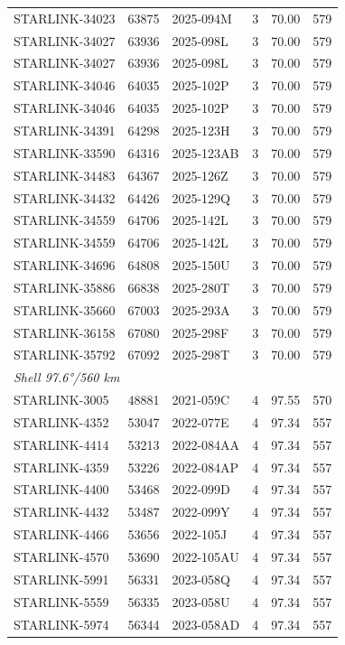 \begin{longtable}{lllccc}
STARLINK-34023 & 63875 & 2025-094M & 3 & 70.00 & 579 \\
STARLINK-34027 & 63936 & 2025-098L & 3 & 70.00 & 579 \\
STARLINK-34027 & 63936 & 2025-098L & 3 & 70.00 & 579 \\
STARLINK-34046 & 64035 & 2025-102P & 3 & 70.00 & 579 \\
STARLINK-34046 & 64035 & 2025-102P & 3 & 70.00 & 579 \\
STARLINK-34391 & 64298 & 2025-123H & 3 & 70.00 & 579 \\
STARLINK-33590 & 64316 & 2025-123AB & 3 & 70.00 & 579 \\
STARLINK-34483 & 64367 & 2025-126Z & 3 & 70.00 & 579 \\
STARLINK-34432 & 64426 & 2025-129Q & 3 & 70.00 & 579 \\
STARLINK-34559 & 64706 & 2025-142L & 3 & 70.00 & 579 \\
STARLINK-34559 & 64706 & 2025-142L & 3 & 70.00 & 579 \\
STARLINK-34696 & 64808 & 2025-150U & 3 & 70.00 & 579 \\
STARLINK-35886 & 66838 & 2025-280T & 3 & 70.00 & 579 \\
STARLINK-35660 & 67003 & 2025-293A & 3 & 70.00 & 579 \\
STARLINK-36158 & 67080 & 2025-298F & 3 & 70.00 & 579 \\
STARLINK-35792 & 67092 & 2025-298T & 3 & 70.00 & 579 \\
\midrule
\multicolumn{6}{l}{\textit{Shell 97.6°/560 km}} \\
STARLINK-3005 & 48881 & 2021-059C & 4 & 97.55 & 570 \\
STARLINK-4352 & 53047 & 2022-077E & 4 & 97.34 & 557 \\
STARLINK-4414 & 53213 & 2022-084AA & 4 & 97.34 & 557 \\
STARLINK-4359 & 53226 & 2022-084AP & 4 & 97.34 & 557 \\
STARLINK-4400 & 53468 & 2022-099D & 4 & 97.34 & 557 \\
STARLINK-4432 & 53487 & 2022-099Y & 4 & 97.34 & 557 \\
STARLINK-4466 & 53656 & 2022-105J & 4 & 97.34 & 557 \\
STARLINK-4570 & 53690 & 2022-105AU & 4 & 97.34 & 557 \\
STARLINK-5991 & 56331 & 2023-058Q & 4 & 97.34 & 557 \\
STARLINK-5559 & 56335 & 2023-058U & 4 & 97.34 & 557 \\
STARLINK-5974 & 56344 & 2023-058AD & 4 & 97.34 & 557 \\

\end{longtable}
